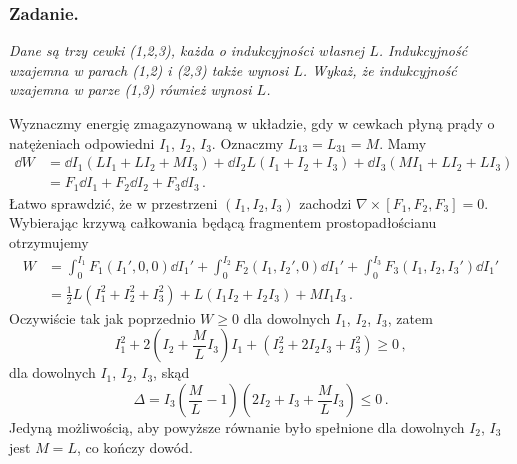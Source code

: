 \documentclass[../main.tex]{subfiles}
\begin{document}
\subsubsection*{Zadanie.} \textit{Dane są trzy cewki (1,2,3), każda o indukcyjności własnej \(L\). Indukcyjność wzajemna w parach (1,2) i (2,3) także wynosi \(L\). Wykaż, że indukcyjność wzajemna w parze (1,3) również wynosi \(L\).}
\medskip

Wyznaczmy energię zmagazynowaną w układzie, gdy w cewkach płyną prądy o natężeniach odpowiedni \(I_1\), \(I_2\), \(I_3\). Oznaczmy \(L_{13}=L_{31}=M\). Mamy
\begin{equation*}
\begin{split}
    \dd{W}&=\dd{I_1}(LI_1+LI_2+MI_3)+\dd{I_2}L(I_1+I_2+I_3)+\dd{I_3}(MI_1+LI_2+LI_3)\\
    &=F_1\dd{I_1}+F_2\dd{I_2}+F_3\dd{I_3}\,.
\end{split}
\end{equation*}
Łatwo sprawdzić, że w przestrzeni \((I_1,I_2,I_3)\) zachodzi \(\nabla\times[F_1,F_2,F_3]=0\). Wybierając krzywą całkowania będącą fragmentem prostopadłościanu otrzymujemy
\begin{equation*}
\begin{split}
    W&=\int_0^{I_1}F_1(I_1',0,0)\dd{I_1'}+\int_0^{I_2}F_2(I_1,I_2',0)\dd{I_1'}+\int_0^{I_3}F_3(I_1,I_2,I_3')\dd{I_1'}\\
    &=\frac{1}{2}L(I_1^2+I_2^2+I_3^2)+L(I_1I_2+I_2I_3)+MI_1I_3\,.
\end{split}
\end{equation*}
Oczywiście tak jak poprzednio \(W\geq0\) dla dowolnych \(I_1\), \(I_2\), \(I_3\), zatem
\begin{equation*}
    I_1^2+2\left(I_2+\frac{M}{L}I_3\right)I_1+(I_2^2+2I_2I_3+I_3^2)\geq0\,,
\end{equation*}
dla dowolnych \(I_1\), \(I_2\), \(I_3\), skąd
\begin{equation*}
    \Delta = I_3\left(\frac{M}{L}-1\right)\left(2I_2+I_3+\frac{M}{L}I_3\right)\leq0\,.
\end{equation*}
Jedyną możliwością, aby powyższe równanie było spełnione dla dowolnych \(I_2\), \(I_3\) jest \(M=L\), co kończy dowód.
\end{document}
